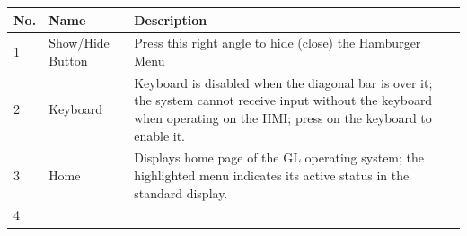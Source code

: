 \begin{longtable}[]{@{}|l|l|l|@{}}
\toprule
\rowcolor{brown}\begin{minipage}[b]{0.04\columnwidth}\raggedright
{\bf{No.}}\strut
\end{minipage} & \begin{minipage}[b]{0.23\columnwidth}\raggedright
{\bf{Name}}\strut
\end{minipage} & \begin{minipage}[b]{0.65\columnwidth}\raggedright
{\bf{Description}}\strut
\end{minipage}\tabularnewline
\midrule
\endhead
\begin{minipage}[t]{0.04\columnwidth}\raggedright
1\strut
\end{minipage} & \begin{minipage}[t]{0.23\columnwidth}\raggedright
Show/Hide Button\strut
\end{minipage} & \begin{minipage}[t]{0.65\columnwidth}\raggedright
Press this right angle to hide (close) the Hamburger Menu\strut
\end{minipage}\tabularnewline
\begin{minipage}[t]{0.04\columnwidth}\raggedright
2\strut
\end{minipage} & \begin{minipage}[t]{0.23\columnwidth}\raggedright
Keyboard\strut
\end{minipage} & \begin{minipage}[t]{0.65\columnwidth}\raggedright
Keyboard is disabled when the diagonal bar is over it; the system cannot
receive input without the keyboard when operating on the HMI; press on
the keyboard to enable it.\strut
\end{minipage}\tabularnewline
\begin{minipage}[t]{0.04\columnwidth}\raggedright
3\strut
\end{minipage} & \begin{minipage}[t]{0.23\columnwidth}\raggedright
Home\strut
\end{minipage} & \begin{minipage}[t]{0.65\columnwidth}\raggedright
Displays home page of the GL operating system; the highlighted menu
indicates its active status in the standard display.\strut
\end{minipage}\tabularnewline
\begin{minipage}[t]{0.04\columnwidth}\raggedright
4\strut
\end{minipage} & \begin{minipage}[t]{0.23\columnwidth}\raggedright

\end{minipage}
\end{longtable}
